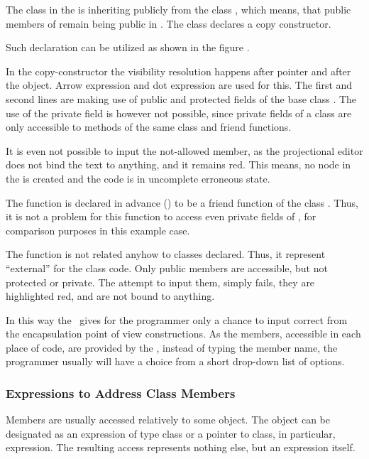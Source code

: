 The class  in the  is inheriting publicly from the class , which means,
that public members of  remain being public in . The class  declares
a copy constructor.

Such declaration can be utilized as shown in the figure .


In the copy-constructor the visibility resolution happens after  pointer
and after the  object. Arrow expression and dot expression are used for
this. The first and second lines are making use of public and protected fields of 
the base class . The use of the private field is however not possible, since
private fields of a class are only accessible to methods of the same class and
friend functions. 

It is even not possible to input the not-allowed member, as the projectional editor
does not bind the text to anything, and it remains red. This means, no node in the 
is created and the code is in uncomplete erroneous state.


The  function is declared in advance () to be a friend 
function of the class . Thus, it is not a problem for this function to access
even private fields of , for comparison purposes in this example case.

The function  is not related anyhow to classes declared. Thus,
it represent ``external'' for the class  code. Only public members
are accessible, but not protected or private. The attempt to input them, simply
fails, they are highlighted red, and are not bound to anything.

In this way the \pcpp\ gives for the programmer only a chance to input correct from the encapsulation
point of view constructions. As the members, accessible in each place of code, are provided by the 
\pcpp, instead of typing the member name, the programmer usually will have a choice from a short drop-down
list of options.

\subsubsection{Expressions to Address Class Members}


Members are usually accessed relatively to some object. The object can be designated as an expression of type class or a pointer to class,
in particular,  expression. The resulting access represents nothing else, but an expression itself.

